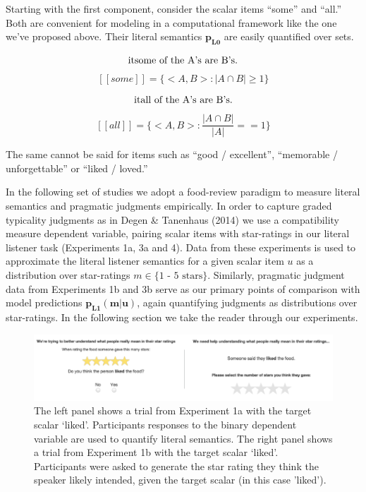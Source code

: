 \documentclass[10pt, letterpaper]{article}
\newenvironment{CodeChunk}{}{}
\begin{document}
Starting with the first component, consider the scalar items ``some''
and ``all.'' Both are convenient for modeling in a computational
framework like the one we've proposed above. Their literal semantics
\(\mathbf{p_{L0}}\) are easily quantified over sets.

\[\text{\text it{some of the A's are B's.}}\]
\[[[some]] = \{<A, B> : |A \cap B| \geq 1 \}\]

\[\text{\text it{all of the A's are B's.}}\]
\[[[all]] = \{<A, B> : \frac{|A \cap B|}{|A|} == 1 \}\]

The same cannot be said for items such as ``good / excellent'',
``memorable / unforgettable'' or ``liked / loved.''

In the following set of studies we adopt a food-review paradigm to
measure literal semantics and pragmatic judgments empirically. In order
to capture graded typicality judgments as in Degen \& Tanenhaus (2014)
we use a compatibility measure dependent variable, pairing scalar items
with star-ratings in our literal listener task (Experiments 1a, 3a and
4). Data from these experiments is used to approximate the literal
listener semantics for a given scalar item \(u\) as a distribution over
star-ratings \(m \in \text{\{1 - 5 stars\}}\). Similarly, pragmatic
judgment data from Experiments 1b and 3b serve as our primary points of
comparison with model predictions \(\mathbf{p_{L1}(m|u)}\), again
quantifying judgments as distributions over star-ratings. In the
following section we take the reader through our experiments.

\begin{CodeChunk}
\begin{figure}[t]

{\centering \includegraphics{figs/stimuli_exp1-1} 

}

\caption[The left panel shows a trial from Experiment 1a with the target scalar `liked']{The left panel shows a trial from Experiment 1a with the target scalar `liked'. Participants responses to the binary dependent variable are used to quantify literal semantics. The right panel shows a trial from Experiment 1b with the target scalar `liked'. Participants were asked to generate the star rating they think the speaker likely intended, given the target scalar (in this case 'liked').}\label{fig:stimuli_exp1}
\end{figure}
\end{CodeChunk}
\end{document}
